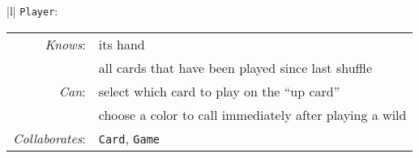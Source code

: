 \begin{center}
\begin{tabular}{|l|}
\hline
\texttt{Player}:\\
\hline
\begin{tabular}{rl}
\textit{Knows}: & its hand \\
& all cards that have been played since last shuffle \\
\textit{Can}: & select which card to play on the ``up card'' \\
& choose a color to call immediately after playing a wild \\
\hline
\textit{Collaborates}: & \texttt{Card}, \texttt{Game} \\
\end{tabular}\\
\hline
\end{tabular}
\end{center}

\normalsize

